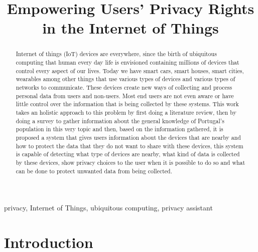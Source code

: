 \documentclass[conference]{IEEEtran}
\begin{document}
\title{Empowering Users' Privacy Rights in the Internet of Things\\
}

\author{
}

\maketitle

\begin{abstract}
Internet of things (IoT) devices are everywhere, since the birth of ubiquitous
computing that human every day life is envisioned containing millions of devices
that control every aspect of our lives. Today we have smart cars, smart houses,
smart cities, wearables among other things that use various types of devices
and various types of networks to communicate. These devices create new ways
of collecting and process personal data from users and non-users.
Most end users are not even aware or have little control over the information that
is being collected by these systems. This work takes an holistic approach to this
problem by first doing a literature review, then by doing a survey to gather
information about the general knowledge of Portugal's population in this
very topic and then, based on the information gathered, it is proposed
a system that gives users information about the devices that are nearby
and how to protect the data that they do not want to share with these devices,
this system is capable of detecting what type of devices are nearby,
what kind of data is collected by these devices, show privacy choices
to the user when it is possible to do so and what can be done to protect
unwanted data from being collected.
\end{abstract}

\begin{IEEEkeywords}
privacy, Internet of Things, ubiquitous computing, privacy assistant
\end{IEEEkeywords}

\section{Introduction}
\end{document}
